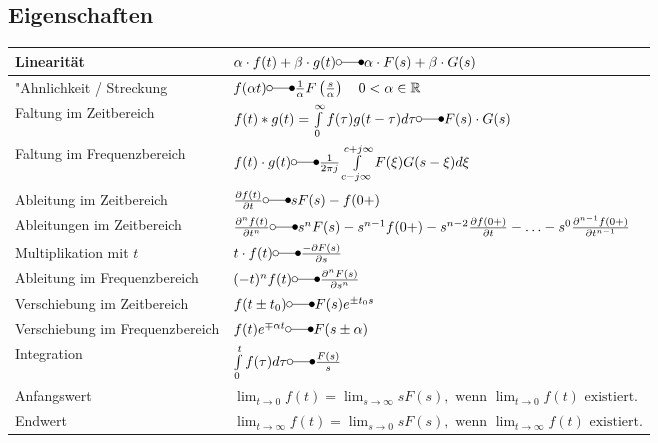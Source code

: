  	\subsection{Eigenschaften}
  		\renewcommand{\arraystretch}{2}
		\begin{tabular}{|p{6cm}|p{11cm}|}
        	\hline
        	Linearität & 
 			$\alpha\cdot f(t) + \beta\cdot g(t) \laplace \alpha\cdot F(s) + \beta\cdot
 			G(s)$ \\
 			\hline
 			"Ahnlichkeit / Streckung &
 			$f(\alpha t) \laplace \frac{1}{\alpha}F \left (\frac{s}{\alpha} \right ) \quad 0
 			<\alpha \in\mathbb{R}$ \\
 			\hline
 			Faltung im Zeitbereich &
 			$f(t) \ast g(t) = \int\limits_{0}^{\infty} f(\tau)g(t-\tau)d\tau \laplace F(s)
 			\cdot G(s)$\\
 			\hline
 			Faltung im Frequenzbereich &
 			$f(t) \cdot g(t) \laplace \frac{1}{2\pi j}\int\limits_{c-j\infty}^{c+j\infty}
 			F(\xi) G(s-\xi)d\xi$ \\
 			\hline
 			Ableitung im Zeitbereich &
 			$\frac{\partial f(t)}{\partial t} \laplace sF(s)
 			-f(0+)$ \\
 			\hline
 			Ableitungen im Zeitbereich &
 			$\frac{\partial^n f(t)}{\partial t^n} \laplace s^nF(s)
 			-s^{n-1}f(0+)-s^{n-2}\frac{\partial f(0+)}{\partial t}-\ldots
 			-s^0\frac{\partial^{n-1} f(0+)}{\partial t^{n-1}}$ \\
 			\hline
 			Multiplikation mit $t$ &
 			$t\cdot f(t)  \laplace \frac{-\partial F(s)}{\partial s}$ \\
 			\hline
 			Ableitung im Frequenzbereich &
 			$(-t)^n f(t) \laplace  \frac{\partial^n F(s)}{\partial s^n}$ \\
 			\hline
 			Verschiebung im Zeitbereich &
 			$f(t\pm t_0) \laplace F(s)e^{\pm t_0 s}$ \\
 			\hline
 			Verschiebung im Frequenzbereich &
 			$f(t)e^{\mp\alpha t} \laplace F(s\pm\alpha)$ \\
 			\hline
 			Integration &
 			$\int\limits_0^t f(\tau)d\tau \laplace \frac{F(s)}{s}$ \\
 			\hline
 			Anfangswert &
 			$\lim_{t\rightarrow 0} f(t) = \lim_{s\rightarrow \infty} sF(s),\text{~wenn
 			}  \lim_{t\rightarrow 0} f(t)\text{~existiert}.$ \\
 			\hline
 			Endwert &
 			$\lim_{t\rightarrow \infty} f(t) = \lim_{s\rightarrow 0} sF(s),\text{~wenn
 			}  \lim_{t\rightarrow \infty} f(t)\text{~existiert}.$ \\
 			\hline
       	\end{tabular}
		\renewcommand{\arraystretch}{1}
	
